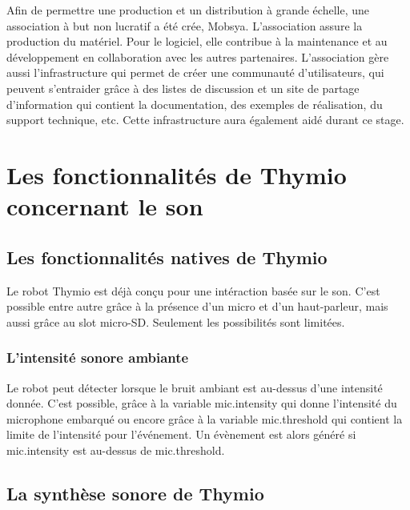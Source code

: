 \documentclass[a4paper, 12pt]{report}
\begin{document}
Afin de permettre une production et un distribution à grande échelle, une association à but non lucratif a été crée, Mobsya. L'association assure la production du matériel. Pour le logiciel, elle contribue à la maintenance et au développement en collaboration avec les autres partenaires. L'association gère aussi l'infrastructure qui permet de créer une communauté d'utilisateurs, qui peuvent s'entraider grâce à des listes de discussion et un site de partage d'information qui contient la documentation, des exemples de réalisation, du support technique, etc. Cette infrastructure aura également aidé durant ce stage.

\chapter{Les fonctionnalités de Thymio \pageref{thymio} concernant le son}
\section{Les fonctionnalités natives de Thymio \pageref{thymio} }
Le robot Thymio \pageref{thymio} est déjà conçu pour une intéraction basée sur le son. C'est possible entre autre grâce à la présence d'un micro et d'un haut-parleur, mais aussi grâce au slot micro-SD. Seulement les possibilités sont limitées.

\subsection{L'intensité sonore ambiante}
Le robot peut détecter lorsque le bruit ambiant est au-dessus d'une intensité donnée. C'est possible, grâce à la variable mic.intensity qui donne l'intensité du microphone embarqué ou encore grâce à la variable mic.threshold qui contient la limite de l'intensité pour l'événement. Un évènement est alors généré si mic.intensity est au-dessus de mic.threshold.\\

\section{La synthèse sonore de Thymio \pageref{thymio}}
\end{document}
